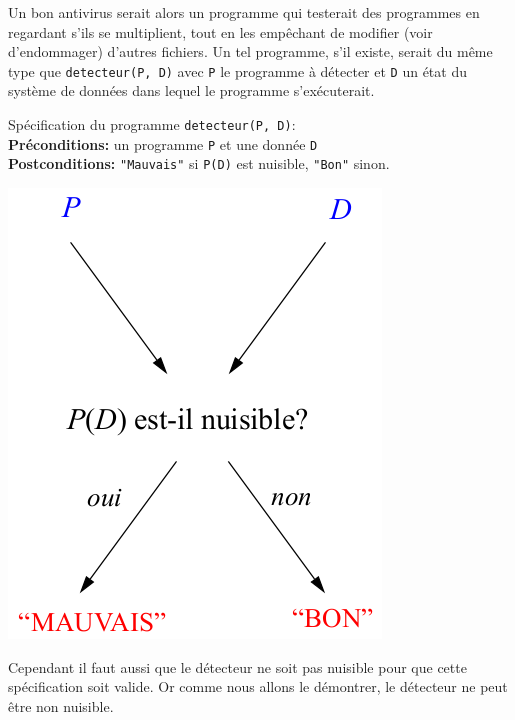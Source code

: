 Un bon antivirus serait alors un programme qui testerait des programmes en regardant s'ils se multiplient, tout en les empêchant de modifier (voir d'endommager) d'autres fichiers. Un tel programme, s'il existe, serait du même type que \lstinline|detecteur(P, D)| avec \lstinline|P| le programme à détecter et \lstinline|D| un état du système de données dans lequel le programme s'exécuterait.

\noindent Spécification du programme \lstinline|detecteur(P, D)|:\\
\textbf{Préconditions:} un programme \lstinline|P| et une donnée \lstinline|D|\\
\textbf{Postconditions:} \lstinline|"Mauvais"| si \lstinline|P(D)| est nuisible, \lstinline|"Bon"| sinon.

\begin{center}
	\includegraphics[scale=0.45]{Images/effet_detecteur}
\end{center}

Cependant il faut aussi que le détecteur ne soit pas nuisible pour que cette spécification soit valide. Or comme nous allons le démontrer, le détecteur ne peut être non nuisible.


